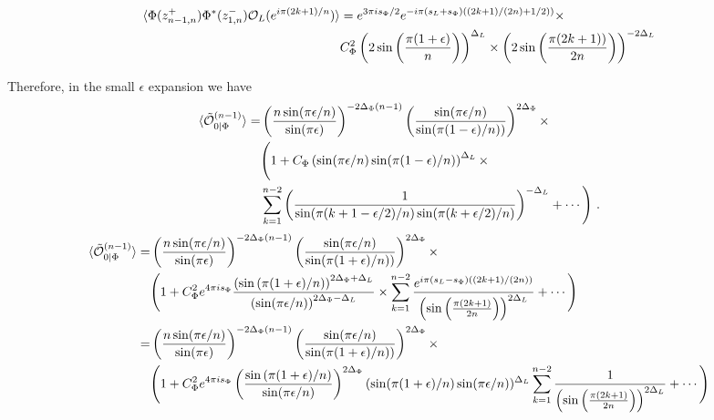 \documentclass[11pt]{article}
\newcommand{\ep}{\epsilon}
\newcommand{\mO}{\mathcal{O}}
\newcommand{\nn}{\nonumber}
\newcommand{\lb}{\left(}
\newcommand{\rb}{\right)}
\begin{document}
\begin{align}
\braket{\Phi(z^+_{n-1,n})\Phi^*(z^-_{1,n})\mO_L(e^{i\pi(2k+1) /n})}&=e^{3\pi i s_\Phi/2}e^{-i\pi (s_L+s_\Phi)\lb (2k+1)/(2n)+1/2)\rb} \times \nn\\
&C_\Phi^2\lb 2\sin\lb\frac{\pi(1+\ep)}{n}\rb\rb^{\Delta_L}\times\lb 2\sin\lb\frac{\pi(2k+ 1))}{2n}\rb\rb^{-2\Delta_L}\nn\\
\end{align}


Therefore, in the small $\ep$ expansion we have
\begin{align}
\braket{\tilde{\mO}_{0|\Phi}^{(n-1)}}=&\lb \frac{n \sin(\pi\ep/n)}{\sin(\pi\ep)}\rb^{-2\Delta_\Phi (n-1)}\lb\frac{\sin(\pi\ep/n)}{\sin(\pi(1-\ep)/n))}\rb^{2\Delta_\Phi}
\times\nn\\
&\Bigg( 1+C_\Phi\lb\sin(\pi\epsilon/n)\sin(\pi(1-\epsilon)/n)\rb^{\Delta_L}\times \nn \\
&\sum_{k=1}^{n-2}\lb \frac{1}{\sin(\pi (k+1-\ep/2)/n) \sin (\pi (k+\ep/2) /n)}\rb^{-\Delta_L} +\cdots\Bigg)\ .
\end{align}
\begin{align}
\braket{\tilde{\mO}_{0|\Phi}^{(n-1)}}=&\lb \frac{n \sin(\pi\ep/n)}{\sin(\pi\ep)}\rb^{-2\Delta_\Phi (n-1)}\lb\frac{\sin(\pi\ep/n)}{\sin(\pi(1+\ep)/n))}\rb^{2\Delta_\Phi}
\times\nn\\
&\Bigg( 1+C_\Phi^2 e^{4\pi i s_\Phi} \frac{\lb \sin \lb \pi (1+\ep)/n\rb \rb^{2\Delta_\Phi + \Delta_L}}{\lb \sin (\pi \ep / n)\rb^{2\Delta_\Phi - \Delta_L}}\times \sum_{k=1}^{n-2} \frac{e^{i \pi (s_L - s_\Phi)((2k+1)/(2n))}}{\lb \sin\lb \frac{ \pi(2k+1)}{2n}\rb\rb^{2\Delta_L } } +\cdots\Bigg) \\
=& \lb \frac{n \sin(\pi\ep/n)}{\sin(\pi\ep)}\rb^{-2\Delta_\Phi (n-1)}\lb\frac{\sin(\pi\ep/n)}{\sin(\pi(1+\ep)/n))}\rb^{2\Delta_\Phi}
\times\nn\\
&\Bigg( 1+C_\Phi^2 e^{4\pi i s_\Phi} \lb\frac{ \sin \lb \pi (1+\ep)/n\rb }{ \sin (\pi \ep / n)}\rb^{2\Delta_\Phi}(\sin(\pi(1+\ep)/n)\sin (\pi \ep/n))^{ \Delta_L} \sum_{k=1}^{n-2} \frac{1}{\lb \sin\lb \frac{ \pi(2k+1)}{2n}\rb\rb^{2\Delta_L} } +\cdots\Bigg)
\end{align}
\end{document}
